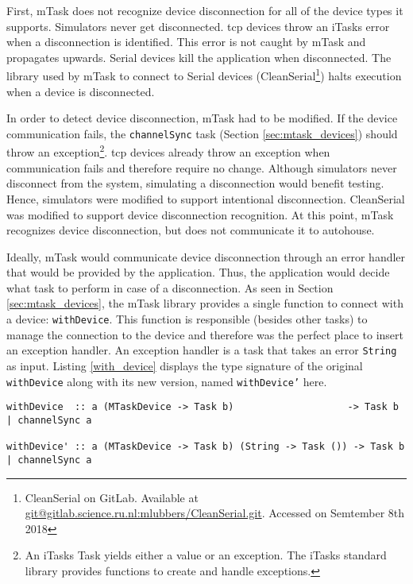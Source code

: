 First, \gls{mTask} does not recognize device disconnection for all of the device types it supports. Simulators never get disconnected. \acs{tcp} devices throw an \gls{iTasks} error when a disconnection is identified. This error is not caught by mTask and propagates upwards. Serial devices kill the application when disconnected. The library used by \gls{mTask} to connect to Serial devices (CleanSerial\footnote{CleanSerial on GitLab. Available at \url{git@gitlab.science.ru.nl:mlubbers/CleanSerial.git}. Accessed on Semtember 8th 2018}) halts execution when a device is disconnected. 

In order to detect device disconnection, \gls{mTask} had to be modified. If the device communication fails, the \texttt{channelSync} task (Section \ref{sec:mtask_devices}) should throw an exception\footnote{An \gls{iTasks} Task yields either a value or an exception. The \gls{iTasks} standard library provides functions to create and handle exceptions.}. \acs{tcp} devices already throw an exception when communication fails and therefore require no change. Although simulators never disconnect from the system, simulating a disconnection would benefit testing. Hence, simulators were modified to support intentional disconnection. CleanSerial was modified to support device disconnection recognition. At this point, \gls{mTask} recognizes device disconnection, but does not communicate it to \gls{autohouse}. 

Ideally, \gls{mTask} would communicate device disconnection through an error handler that would be provided by the application. Thus, the application would decide what task to perform in case of a disconnection. As seen in Section \ref{sec:mtask_devices}, the \gls{mTask} library provides a single function to connect with a device: \texttt{withDevice}. This function is responsible (besides other tasks) to manage the connection to the device and therefore was the perfect place to insert an exception handler. An exception handler is a task that takes an error \texttt{String} as input. Listing \ref{with_device} displays the type signature of the original \texttt{withDevice} along with its new version, named \texttt{withDevice'} here. 

\begin{lstlisting}[caption=Change in mTask to support a device disconnection handler,captionpos=b,label=with_device]
withDevice  :: a (MTaskDevice -> Task b)                    -> Task b | channelSync a

withDevice' :: a (MTaskDevice -> Task b) (String -> Task ()) -> Task b | channelSync a
\end{lstlisting}

